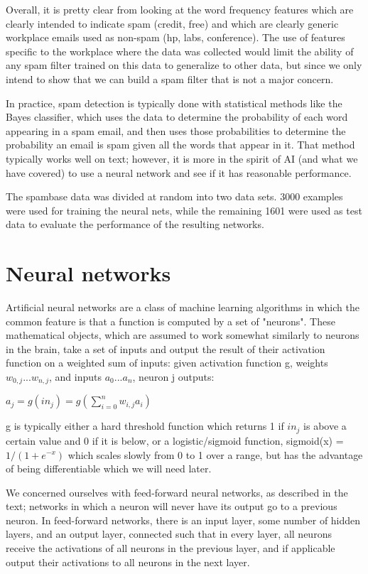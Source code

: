 \documentclass[11pt]{article} %
\begin{document}
Overall, it is pretty clear from looking at the word frequency features which are clearly intended to indicate spam (credit, free) and which are clearly generic workplace emails used as non-spam (hp, labs, conference). The use of features specific to the workplace where the data was collected would limit the ability of any spam filter trained on this data to generalize to other data, but since we only intend to show that we can build a spam filter that is not a major concern.

In practice, spam detection is typically done with statistical methods like the Bayes classifier, which uses the data to determine the probability of each word appearing in a spam email, and then uses those probabilities to determine the probability an email is spam given all the words that appear in it. That method typically works well on text; however, it is more in the spirit of AI (and what we have covered) to use a neural network and see if it has reasonable performance.

The spambase data was divided at random into two data sets. 3000 examples were used for training the neural nets, while the remaining 1601 were used as test data to evaluate the performance of the resulting networks.

\section{Neural networks}

Artificial neural networks are a class of machine learning algorithms in which the common feature is that a function is computed by a set of "neurons". These mathematical objects, which are assumed to work somewhat similarly to neurons in the brain, take a set of inputs and output the result of their activation function on a weighted sum of inputs: given activation function g, weights $w_{0,j} ... w_{n,j}$, and inputs $a_0...a_n$, neuron j outputs:

$a_j = g(in_j) = g(\sum_{i=0}^n w_{i,j}a_i)$

g is typically either a hard threshold function which returns 1 if $in_j$ is above a certain value and 0 if it is below, or a logistic/sigmoid function, sigmoid(x) = $1/(1+e^{-x})$ which scales slowly from 0 to 1 over a range, but has the advantage of being differentiable which we will need later.

We concerned ourselves with feed-forward neural networks, as described in the text; networks in which a neuron will never have its output go to a previous neuron. In feed-forward networks, there is an input layer, some number of hidden layers, and an output layer, connected such that in every layer, all neurons receive the activations of all neurons in the previous layer, and if applicable output their activations to all neurons in the next layer.
\end{document}
